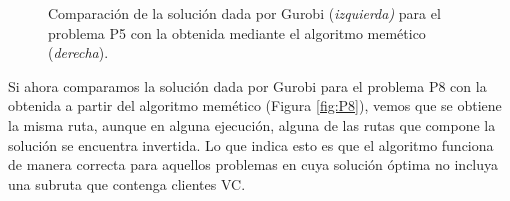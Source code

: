 \begin{figure}[!b]
\begin{tikzpicture}[scale=1, every node/.style={scale=0.8}]
          
    
    \end{tikzpicture}

    \caption{Comparación de la solución dada por Gurobi (\textit{izquierda)} para el problema P5 con la obtenida mediante el algoritmo memético (\textit{derecha}).}
    \label{fig:P5}
\end{figure}

Si ahora comparamos la solución dada por Gurobi para el problema P8 con la obtenida a partir del algoritmo memético (Figura \ref{fig:P8}), vemos que se obtiene la misma ruta, aunque en alguna ejecución, alguna de las rutas que compone la solución se encuentra invertida. Lo que indica esto es que el algoritmo funciona de manera correcta para aquellos problemas en cuya solución óptima no incluya una subruta que contenga clientes VC.  


